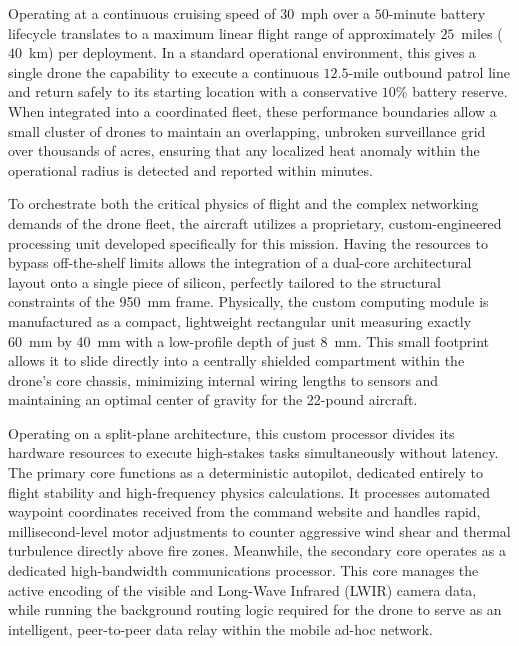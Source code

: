 \documentclass[journal, onecolumn]{IEEEtran}
\begin{document}
Operating at a continuous cruising speed of $30$~mph over a $50$-minute battery lifecycle translates to a maximum linear flight range of approximately $25$~miles ($40$~km) per deployment. In a standard operational environment, this gives a single drone the capability to execute a continuous $12.5$-mile outbound patrol line and return safely to its starting location with a conservative $10\%$ battery reserve. When integrated into a coordinated fleet, these performance boundaries allow a small cluster of drones to maintain an overlapping, unbroken surveillance grid over thousands of acres, ensuring that any localized heat anomaly within the operational radius is detected and reported within minutes.

To orchestrate both the critical physics of flight and the complex networking demands of the drone fleet, the aircraft utilizes a proprietary, custom-engineered processing unit developed specifically for this mission. Having the resources to bypass off-the-shelf limits allows the integration of a dual-core architectural layout onto a single piece of silicon, perfectly tailored to the structural constraints of the 950~mm frame. Physically, the custom computing module is manufactured as a compact, lightweight rectangular unit measuring exactly 60~mm by 40~mm with a low-profile depth of just 8~mm. This small footprint allows it to slide directly into a centrally shielded compartment within the drone’s core chassis, minimizing internal wiring lengths to sensors and maintaining an optimal center of gravity for the 22-pound aircraft.

Operating on a split-plane architecture, this custom processor divides its hardware resources to execute high-stakes tasks simultaneously without latency. The primary core functions as a deterministic autopilot, dedicated entirely to flight stability and high-frequency physics calculations. It processes automated waypoint coordinates received from the command website and handles rapid, millisecond-level motor adjustments to counter aggressive wind shear and thermal turbulence directly above fire zones. Meanwhile, the secondary core operates as a dedicated high-bandwidth communications processor. This core manages the active encoding of the visible and Long-Wave Infrared (LWIR) camera data, while running the background routing logic required for the drone to serve as an intelligent, peer-to-peer data relay within the mobile ad-hoc network.
\end{document}
